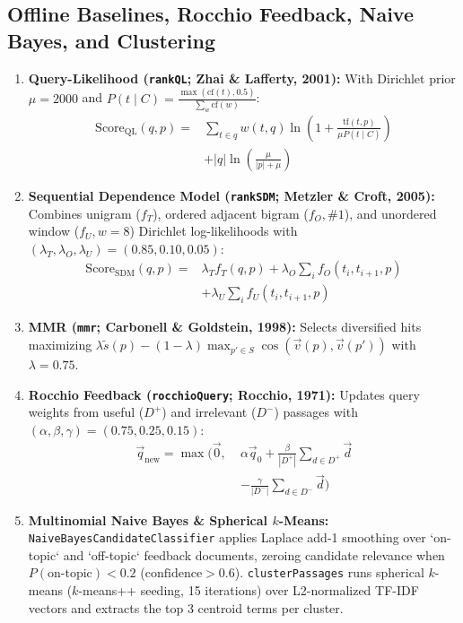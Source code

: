 \documentclass[conference]{IEEEtran}
\begin{document}
\subsection{Offline Baselines, Rocchio Feedback, Naive Bayes, and Clustering}
\begin{enumerate}
    \item \textbf{Query-Likelihood (\texttt{rankQL}; Zhai \& Lafferty, 2001):} With Dirichlet prior $\mu = 2000$ and $P(t \mid C) = \frac{\max(\text{cf}(t), 0.5)}{\sum_w \text{cf}(w)}$:
    \begin{equation}
    \begin{split}\text{Score}_{\text{QL}}(q, p) ={}& \sum_{t \in q} w(t, q)\ln\!\left(1 + \frac{\text{tf}(t, p)}{\mu P(t \mid C)}\right)\\ &+ |q|\ln\!\left(\frac{\mu}{|p| + \mu}\right)\end{split}
    \end{equation}
    \item \textbf{Sequential Dependence Model (\texttt{rankSDM}; Metzler \& Croft, 2005):} Combines unigram ($f_T$), ordered adjacent bigram ($f_O, \#1$), and unordered window ($f_U, w=8$) Dirichlet log-likelihoods with $(\lambda_T, \lambda_O, \lambda_U) = (0.85, 0.10, 0.05)$:
    \begin{equation}
    \begin{split}\text{Score}_{\text{SDM}}(q, p) ={}& \lambda_T f_T(q, p) + \lambda_O \sum_{i} f_O(t_i, t_{i+1}, p)\\ &+ \lambda_U \sum_{i} f_U(t_i, t_{i+1}, p)\end{split}
    \end{equation}
    \item \textbf{MMR (\texttt{mmr}; Carbonell \& Goldstein, 1998):} Selects diversified hits maximizing $\lambda \tilde{s}(p) - (1-\lambda)\max_{p' \in S}\cos(\vec{v}(p), \vec{v}(p'))$ with $\lambda = 0.75$.
    \item \textbf{Rocchio Feedback (\texttt{rocchioQuery}; Rocchio, 1971):} Updates query weights from useful ($D^+$) and irrelevant ($D^-$) passages with $(\alpha, \beta, \gamma) = (0.75, 0.25, 0.15)$:
    \begin{equation}
    \begin{split}\vec{q}_{\text{new}} = \max\Big(\vec{0},\; &\alpha\vec{q}_0 + \frac{\beta}{|D^+|}\sum_{d \in D^+}\vec{d}\\ &- \frac{\gamma}{|D^-|}\sum_{d \in D^-}\vec{d}\Big)\end{split}
    \end{equation}
    \item \textbf{Multinomial Naive Bayes \& Spherical $k$-Means:} \texttt{NaiveBayesCandidateClassifier} applies Laplace add-1 smoothing over `on-topic` and `off-topic` feedback documents, zeroing candidate relevance when $P(\text{on-topic}) < 0.2$ ($\text{confidence} > 0.6$). \texttt{clusterPassages} runs spherical $k$-means ($k$-means++ seeding, 15 iterations) over L2-normalized TF-IDF vectors and extracts the top 3 centroid terms per cluster.
\end{enumerate}
\end{document}
